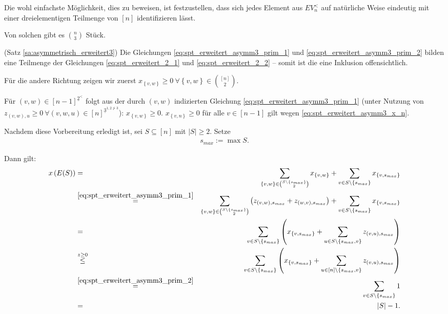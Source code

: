 \documentclass[10p,a4paper,BCOR = 12mm, DIV=15]{scrbook}
\begin{document}
{\begin{bew}
Die wohl einfachste Möglichkeit, dies zu beweisen, ist festzustellen, dass sich jedes Element aus $EV_n^<$ auf natürliche Weise eindeutig mit einer dreielementigen Teilmenge von $\left[n\right]$ identifizieren lässt.

Von solchen gibt es $n \choose 3$ Stück.
\end{bew}

\begin{bew} (Satz \ref{sa:asymmetrisch_erweitert3})
Die Gleichungen \eqref{eq:spt_erweitert_asymm3_prim_1} und \eqref{eq:spt_erweitert_asymm3_prim_2} bilden eine Teilmenge der Gleichungen \eqref{eq:spt_erweitert_2_1} und \eqref{eq:spt_erweitert_2_2} -- somit ist die eine Inklusion offensichtlich.

Für die andere Richtung zeigen wir zuerst $x_{\left\{v, w\right\}}\geq 0 \ \forall \left\{v, w\right\} \in {\left[n\right] \choose 2}$. 

Für $\left(v, w\right)\in [n-1]^{\underline{2}^<}$ folgt aus der durch $\left(v, w\right)$ indizierten Gleichung \eqref{eq:spt_erweitert_asymm3_prim_1} (unter Nutzung von $z_{\left(v, w\right), u} \geq 0 \ \forall \left(v, w, u\right) \in \left[n\right]^{\underline{3}^{1,2\not>3}}$): $x_{\left\{v, w\right\}} \geq 0$. $x_{\left\{v, n\right\}} \geq 0$ für alle $v \in \left[n-1\right]$ gilt wegen \eqref{eq:spt_erweitert_asymm3_x_n}.

Nachdem diese Vorbereitung erledigt ist, sei $S\subseteq \left[n\right]$ mit $\left|S\right| \geq 2$. Setze
\begin{eqnarray*}
s_{max} := \max S.
\end{eqnarray*}

Dann gilt:
{
\allowdisplaybreaks
\begin{eqnarray*}
x\left(E(S)\right) & = & \sum_{\left\{v, w\right\} \in {S \backslash \left\{s_{max}\right\} \choose 2}} x_{\left\{v, w\right\}} + \sum_{v \in S \backslash \left\{s_{max}\right\}} x_{\left\{v, s_{max}\right\}} \\
& \stackrel{\eqref{eq:spt_erweitert_asymm3_prim_1}}{=} & \sum_{\left\{v, w\right\} \in {S \backslash \left\{s_{max}\right\} \choose 2}} \left(z_{\left(v, w\right), s_{max}} + z_{\left(w, v\right), s_{max}}\right) + \sum_{v \in S \backslash \left\{s_{max}\right\}} x_{\left\{v, s_{max}\right\}} \\
& = & \sum_{v \in S \backslash \left\{s_{max}\right\}} \left(x_{\left\{v, s_{max}\right\}} + \sum_{u \in S \backslash \left\{s_{max}, v\right\}} z_{\left(v, u\right), s_{max}}\right) \\
& \stackrel{z \geq 0}{\leq} & \sum_{v \in S \backslash \left\{s_{max}\right\}} \left(x_{\left\{v, s_{max}\right\}} + \sum_{u \in \left[n\right] \backslash \left\{s_{max}, v\right\}} z_{\left(v, u\right), s_{max}}\right) \\
& \stackrel{\eqref{eq:spt_erweitert_asymm3_prim_2}}{=} & \sum_{v \in S \backslash \left\{s_{max}\right\}} 1 \\
& = & \left|S\right| - 1.
\end{eqnarray*}
}


\end{bew}}
\end{document}
